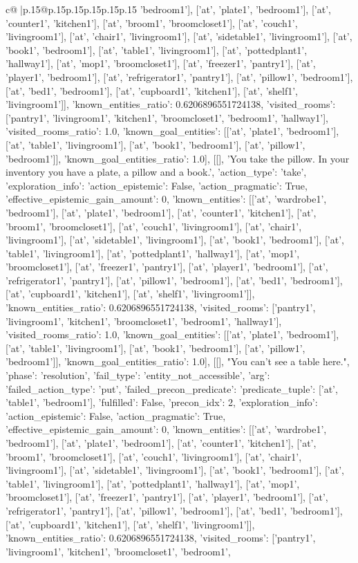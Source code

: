 \documentclass{article}
\begin{document}
{\begin{supertabular}{c@{$\;$}|p{.15\linewidth}@{}p{.15\linewidth}p{.15\linewidth}p{.15\linewidth}p{.15\linewidth}p{.15\linewidth}}
{{{'bedroom1'], ['at', 'plate1', 'bedroom1'], ['at', 'counter1', 'kitchen1'], ['at', 'broom1', 'broomcloset1'], ['at', 'couch1', 'livingroom1'], ['at', 'chair1', 'livingroom1'], ['at', 'sidetable1', 'livingroom1'], ['at', 'book1', 'bedroom1'], ['at', 'table1', 'livingroom1'], ['at', 'pottedplant1', 'hallway1'], ['at', 'mop1', 'broomcloset1'], ['at', 'freezer1', 'pantry1'], ['at', 'player1', 'bedroom1'], ['at', 'refrigerator1', 'pantry1'], ['at', 'pillow1', 'bedroom1'], ['at', 'bed1', 'bedroom1'], ['at', 'cupboard1', 'kitchen1'], ['at', 'shelf1', 'livingroom1']], 'known_entities_ratio': 0.6206896551724138, 'visited_rooms': ['pantry1', 'livingroom1', 'kitchen1', 'broomcloset1', 'bedroom1', 'hallway1'], 'visited_rooms_ratio': 1.0, 'known_goal_entities': [['at', 'plate1', 'bedroom1'], ['at', 'table1', 'livingroom1'], ['at', 'book1', 'bedroom1'], ['at', 'pillow1', 'bedroom1']], 'known_goal_entities_ratio': 1.0}}], [[], 'You take the pillow. In your inventory you have a plate, a pillow and a book.', {'action_type': 'take', 'exploration_info': {'action_epistemic': False, 'action_pragmatic': True, 'effective_epistemic_gain_amount': 0, 'known_entities': [['at', 'wardrobe1', 'bedroom1'], ['at', 'plate1', 'bedroom1'], ['at', 'counter1', 'kitchen1'], ['at', 'broom1', 'broomcloset1'], ['at', 'couch1', 'livingroom1'], ['at', 'chair1', 'livingroom1'], ['at', 'sidetable1', 'livingroom1'], ['at', 'book1', 'bedroom1'], ['at', 'table1', 'livingroom1'], ['at', 'pottedplant1', 'hallway1'], ['at', 'mop1', 'broomcloset1'], ['at', 'freezer1', 'pantry1'], ['at', 'player1', 'bedroom1'], ['at', 'refrigerator1', 'pantry1'], ['at', 'pillow1', 'bedroom1'], ['at', 'bed1', 'bedroom1'], ['at', 'cupboard1', 'kitchen1'], ['at', 'shelf1', 'livingroom1']], 'known_entities_ratio': 0.6206896551724138, 'visited_rooms': ['pantry1', 'livingroom1', 'kitchen1', 'broomcloset1', 'bedroom1', 'hallway1'], 'visited_rooms_ratio': 1.0, 'known_goal_entities': [['at', 'plate1', 'bedroom1'], ['at', 'table1', 'livingroom1'], ['at', 'book1', 'bedroom1'], ['at', 'pillow1', 'bedroom1']], 'known_goal_entities_ratio': 1.0}}], [[], "You can't see a table here.", {'phase': 'resolution', 'fail_type': 'entity_not_accessible', 'arg': {'failed_action_type': 'put', 'failed_precon_predicate': {'predicate_tuple': ['at', 'table1', 'bedroom1'], 'fulfilled': False, 'precon_idx': 2}}, 'exploration_info': {'action_epistemic': False, 'action_pragmatic': True, 'effective_epistemic_gain_amount': 0, 'known_entities': [['at', 'wardrobe1', 'bedroom1'], ['at', 'plate1', 'bedroom1'], ['at', 'counter1', 'kitchen1'], ['at', 'broom1', 'broomcloset1'], ['at', 'couch1', 'livingroom1'], ['at', 'chair1', 'livingroom1'], ['at', 'sidetable1', 'livingroom1'], ['at', 'book1', 'bedroom1'], ['at', 'table1', 'livingroom1'], ['at', 'pottedplant1', 'hallway1'], ['at', 'mop1', 'broomcloset1'], ['at', 'freezer1', 'pantry1'], ['at', 'player1', 'bedroom1'], ['at', 'refrigerator1', 'pantry1'], ['at', 'pillow1', 'bedroom1'], ['at', 'bed1', 'bedroom1'], ['at', 'cupboard1', 'kitchen1'], ['at', 'shelf1', 'livingroom1']], 'known_entities_ratio': 0.6206896551724138, 'visited_rooms': ['pantry1', 'livingroom1', 'kitchen1', 'broomcloset1', 'bedroom1', }}}
\end{supertabular}}
\end{document}

